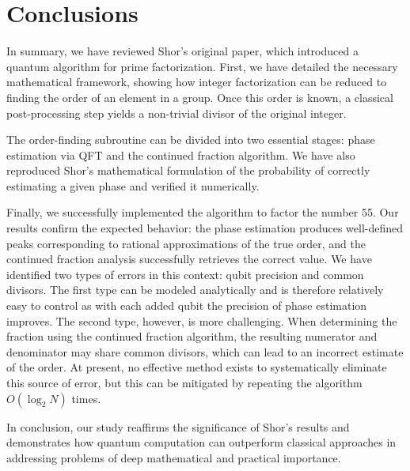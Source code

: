 \documentclass[aps,prl,twocolumn,superscriptaddress,groupedaddress]{revtex4}  %
\begin{document}
\section{Conclusions}
In summary, we have reviewed Shor’s original paper, which introduced a quantum algorithm for prime factorization. First, we have detailed the necessary mathematical framework, showing how integer factorization can be reduced to finding the order of an element in a group. Once this order is known, a classical post-processing step yields a non-trivial divisor of the original integer.

The order-finding subroutine can be divided into two essential stages: phase estimation via QFT and the continued fraction algorithm. We have also reproduced Shor's mathematical formulation of the probability of correctly estimating a given phase and verified it numerically.

Finally, we successfully implemented the algorithm to factor the number 55. Our results confirm the expected behavior: the phase estimation produces well-defined peaks corresponding to rational approximations of the true order, and the continued fraction analysis successfully retrieves the correct value. We have identified two types of errors in this context: qubit precision and common divisors. The first type can be modeled analytically and is therefore relatively easy to control as with each added qubit the precision of phase estimation improves. The second type, however, is more challenging. When determining the fraction using the continued fraction algorithm, the resulting numerator and denominator may share common divisors, which can lead to an incorrect estimate of the order. At present, no effective method exists to systematically eliminate this source of error, but this can be mitigated by repeating the algorithm $O(\log_2 N)$ times.

In conclusion, our study reaffirms the significance of Shor’s results and demonstrates how quantum computation can outperform classical approaches in addressing problems of deep mathematical and practical importance.


\vspace{-0.5cm}

\end{document}
